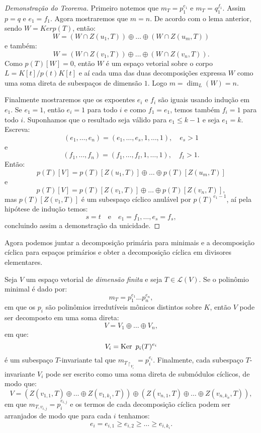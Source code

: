 \documentclass[11pt,twoside,a4paper]{book}
\begin{document}
\begin{proof}[Demonstração do Teorema]
Primeiro notemos que $m_T=p_1^{e_1}$ e $m_T=q_1^{f_1}$. Assim $p=q$ e $e_1=f_1$. Agora mostraremos que $m=n$. De acordo com o lema anterior, sendo $W=Ker p(T)$, então:
\[
W=\left(W\cap Z(u_1,T)\right)\oplus\dots\oplus\left(W\cap Z(u_m,T)\right)
\]
e também:
\[
W=\left(W\cap Z(v_1,T)\right)\oplus\dots\oplus\left(W\cap Z(v_n,T)\right).
\]
Como $p(T)[W]=0$, então $W$ é um espaço vetorial sobre o corpo $L=K[t]/p(t)K[t]$ e aí cada uma das duas decomposições expressa $W$ como uma soma direta de subespaços de dimensão $1$. Logo $m=\dim_L(W)=n$.

\medskip
\noindent
Finalmente mostraremos que os expoentes $e_i$ e $f_i$ são iguais usando indução em $e_1$. Se $e_1=1$, então $e_i=1$ para todo $i$ e como $f_1=e_1$, temos também $f_i=1$ para todo $i$. Suponhamos que o resultado seja válido para $e_1\leq k-1$ e seja $e_1=k$. Escreva:
\[
(e_1,\dots,e_n)=(e_1,\dots,e_s,1,\dots,1),\quad e_s>1
\]
e
\[
(f_1,\dots,f_n)=(f_1,\dots,f_t,1,\dots,1),\quad f_t>1.
\]
Então:
\[
p(T)[V]=p(T)[Z(u_1,T)]\oplus\dots\oplus p(T)[Z(u_m,T)]
\]
e
\[
p(T)[V]=p(T)[Z(v_1,T)]\oplus\dots\oplus p(T)[Z(v_n,T)],
\]
mas $p(T)[Z(v_1,T)]$ é um subespaço cíclico anulável por $p(T)^{e_1-1}$, aí pela hipótese de indução temos:
\[
s=t\quad\text{e}\quad e_1=f_1,\dots,e_s=f_s,
\]
concluindo assim a demonstração da unicidade.
\end{proof}

\noindent
Agora podemos juntar a decomposição primária para minimais e a decomposição cíclica para espaços primários e obter a decomposição cíclica em divisores elementares.

\begin{teorema}
Seja $V$ um espaço vetorial de \emph{dimensão finita} e seja $T\in\mathcal{L}(V)$. Se o polinômio minimal é dado por:
\[
m_T=p_1^{e_1}\dots p_n^{e_n},
\]
em que os $p_i$ são polinômios irredutíveis mônicos distintos sobre $K$, então $V$ pode ser decomposto em uma soma direta:
\[
V=V_1\oplus\dots\oplus V_n,
\]
em que:
\[
V_i=\operatorname{Ker} \ p_i(T)^{e_i}
\]
é um subespaço $T$-invariante tal que $m_{T\upharpoonright_{V_i}}=p_i^{e_i}$. Finalmente, cada subespaço $T$-invariante $V_i$ pode ser escrito como uma soma direta de submódulos cíclicos, de modo que:
\[
V=\left(Z(v_{1,1},T)\oplus\dots\oplus Z(v_{1,k_1},T)\right)\oplus\left(Z(v_{n,1},T)\oplus\dots\oplus Z(v_{n,k_n},T)\right),
\]
em que $m_{T,v_{i,j}}=p_i^{e_{i,j}}$ e os termos de cada decomposição cíclica podem ser arranjados de modo que para cada $i$ tenhamos:
\[
e_i=e_{i,1}\geq e_{i,2}\geq\dots\geq e_{i,k_i}.
\]

\end{teorema}
\end{document}
